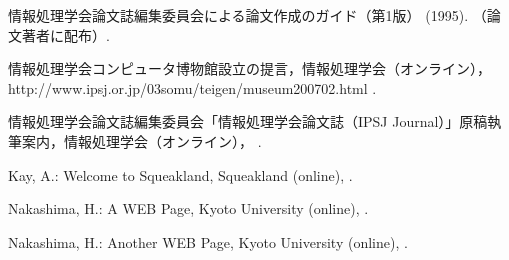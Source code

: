 \begin{thebibliography}{10}
情報処理学会論文誌編集委員会\：{\LaTeX}による論文作成のガイド（第1版） (1995).
\newblock （論文著者に配布）.

情報処理学会\：コンピュータ博物館設立の提言，情報処理学会（オンライン），\urlj%
{http://www.ipsj.or.jp/03somu/teigen/museum200702.html} .

情報処理学会論文誌編集委員会\：「情報処理学会論文誌（IPSJ
  Journal）」原稿執筆案内，情報処理学会（オンライン）， .

Kay, A.: Welcome to Squeakland, Squeakland (online),
  .

Nakashima, H.: A {WEB} Page, Kyoto University (online),
  .

Nakashima, H.: Another {WEB} Page, Kyoto University (online),
   .

\end{thebibliography}

